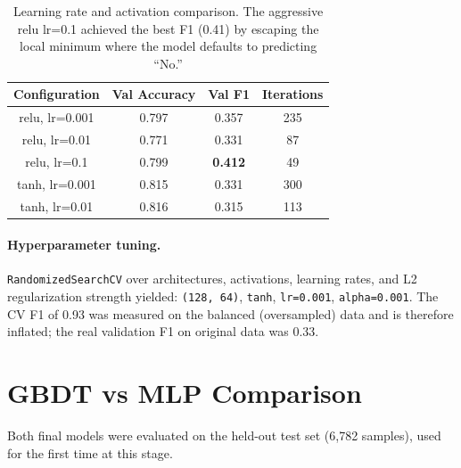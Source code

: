 \documentclass[11pt, a4paper]{article}
\begin{document}
\begin{table}[H]
\centering
\begin{tabular}{cccc}
\toprule
Configuration & Val Accuracy & Val F1 & Iterations \\
\midrule
relu, lr=0.001 & 0.797 & 0.357 & 235 \\
relu, lr=0.01 & 0.771 & 0.331 & 87 \\
relu, lr=0.1 & 0.799 & \textbf{0.412} & 49 \\
tanh, lr=0.001 & 0.815 & 0.331 & 300 \\
tanh, lr=0.01 & 0.816 & 0.315 & 113 \\
\bottomrule
\end{tabular}
\caption{Learning rate and activation comparison. The aggressive relu lr=0.1
         achieved the best F1 (0.41) by escaping the local minimum where the
         model defaults to predicting ``No.''}
\end{table}

\paragraph{Hyperparameter tuning.}
\texttt{RandomizedSearchCV} over architectures, activations, learning rates,
and L2 regularization strength yielded: \texttt{(128, 64)}, \texttt{tanh},
\texttt{lr=0.001}, \texttt{alpha=0.001}. The CV F1 of 0.93 was measured on
the balanced (oversampled) data and is therefore inflated; the real validation
F1 on original data was 0.33.

\section{GBDT vs MLP Comparison}

Both final models were evaluated on the held-out test set (6,782 samples), used
for the first time at this stage.
\end{document}
